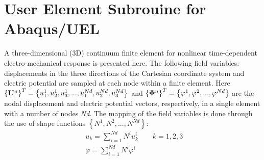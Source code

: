 \section{User Element Subrouine for Abaqus/UEL}
A three-dimensional (3D) continuum finite element for nonlinear time-dependent electro-mechanical response is presented here. 
The following field variables: displacements in the three directions of the Cartesian coordinate system and electric potential are sampled at each node within a finite element.
Here ${\left\{ {{{\bf{U}}^n}} \right\}^T} = \left\{ {u_1^1,u_2^1,u_3^1,...,u_1^{Nd},u_2^{Nd},u_3^{Nd}} \right\}$ and ${\left\{ {{{\bf{\Phi }}^n}} \right\}^T} = \left\{ {{\varphi ^1},{\varphi ^2},...,{\varphi ^{Nd}}} \right\}$ are the nodal displacement and electric potential vectors,
 respectively, in a single element with a number of nodes \textit{Nd}. 
 The mapping of the field variables is done through the use of shape functions $\left\{ {{N^1},{N^2},...,{N^{Nd}}} \right\}$:
\begin{equation}
\begin{aligned}
&{u_k} = \sum\limits_{i = 1}^{Nd} {{N^i}u_k^i} \begin{array}{*{20}{c}}
{}&{}&{k = 1,2,3}
\end{array}\\
&\varphi  = \sum\limits_{i = 1}^{Nd} {{N^i}\varphi _{}^i} 
\end{aligned}
\label{EQN:FEM_uel_shape_funtions}
\end{equation} 

